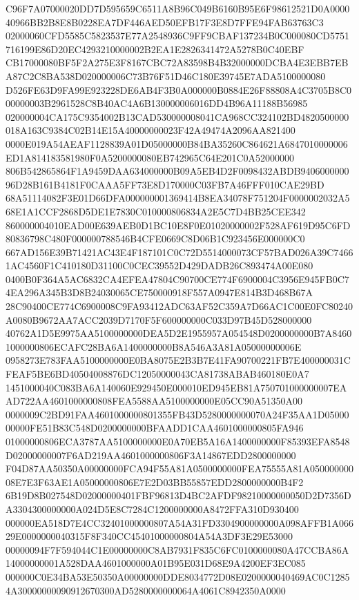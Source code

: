 \documentclass[UTF8,fontset=fandol,zihao=-4,a4paper]{ctexart}
\begin{document}
{{C96F7A07000020DD7D595659C6511A8B96C049B6160B95E6F98612521D0A000040966BB2B8E8B0228EA7DF446AED50EFB17F3E8D7FFE94FAB63763C3
02000060CFD5585C5823537E77A2548936C9FF9CBAF137234B0C000080CD5751716199E86D20EC4293210000002B2EA1E2826341472A5278B0C40EBF
CB17000080BF5F2A275E3F8167CBC72A83598B4B32000000DCBA4E3EBB7EBA87C2C8BA538D020000006C73B76F51D46C180E39745E7ADA5100000080
D526FE63D9FA99E923228DE6AB4F3B0A000000B0884E26F88808A4C3705B8C000000003B2961528C8B40AC4A6B130000006016DD4B96A11188B56985
020000004CA175C9354002B13CAD530000008041CA968CC324102BD4820500000018A163C9384C02B14E15A40000000023F42A49474A2096AA821400
0000E019A54AEAF1128839A01D05000000B84BA35260C864621A6847010000006ED1A814183581980F0A5200000080EB742965C64E201C0A52000000
806B542865864F1A9459DAA634000000B09A5EB4D2F0098432ABDB940600000096D28B161B4181F0CAAA5FF73E8D170000C03FB7A46FFF010CAE29BD
68A51114082F3E01D66DFA000000001369414B8EA34078F751204F0000002032A568E1A1CCF2868D5DE1E7830C010000806834A2E5C7D4BB25CEE342
860000004010EAD00E639AEB0D1BC10E8F0E01020000002F528AF619D95C6FD80836798C480F000000788546B4CFE0669C8D06B1C923456E000000C0
667AD156E39B71421AC43E4F187101C0C72D5514000073CF57BAD026A39C74661AC4560F1C410180D31100C0CEC39552D429DADB26C893474A00E080
0400B0F364A5AC6832CA4EFEA47804C90700CE774F6900004C3956E945FB0C74EA296A345B3D8B24030065CE750000918F557A0947E814B3D468B67A
28C90400CE774C6900008C9FA93412ADC63AF52C359A7D66AC1C00E0FC80240A0080B9672AA7ACC2039D7170F5F600000000C033D97B45D528000000
40762A1D5E9975AA5100000000DEA5D2E1955957A054548D0200000000B7A84601000000806ECAFC28BA6A1400000000B8A546A3A81A05000000006E
0958273E783FAA5100000000E0BA8075E2B3B7E41FA90700221FB7E400000031CFEAF5BE6BD40504008876DC12050000043CA81738ABAB460180E0A7
1451000040C083BA6A140060E929450E000010ED945EB81A750701000000007EAAD722AA4601000000808FEA5588AA5100000000E05CC90A51350A00
0000009C2BD91FAA4601000000801355FB43D5280000000070A24F35AA1D0500000000FE51B83C548D0200000000BFAADD1CAA4601000000805FA946
01000000806ECA3787AA5100000000E0A70EB5A16A1400000000F85393EFA8548D02000000007F6AD219AA4601000000806F3A14867EDD2800000000
F04D87AA50350A00000000FCA94F55A81A0500000000FEA75555A81A05000000008E7E3F63AE1A05000000806E7E2D03BB55857EDD2800000000B4F2
6B19D8B027548D02000000401FBF96813D4BC2AFDF98210000000050D2D7356DA3304300000000A024D5E8C7284C1200000000A8472FFA310D930400
000000EA518D7E4CC32401000000807A54A31FD3304900000000A098AFFB1A06629E0000000040315F8F340CC45401000000804A54A3DF3E29E53000
00000094F7F594044C1E00000000C8AB7931F835C6FC0100000080A47CCBA86A14000000001A528DAA4601000000A01B95E031D68E9A4200EF3EC085
000000C0E34BA53E50350A00000000DDE8034772D08E0200000040469AC0C12854A30000000090912670300AD5280000000064A4061C8942350A0000
}}
\end{document}
